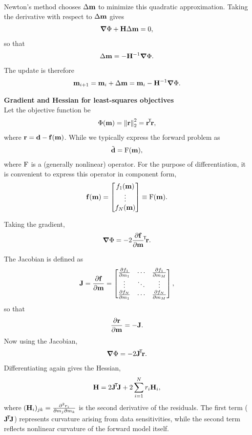 {    Newton's method chooses $\Delta\vb{m}$ to minimize this quadratic approximation. Taking the derivative with respect to $\Delta\vb{m}$ gives
    \[
        \grad \Phi + \vb{H} \Delta\vb{m} = 0,
    \]
    so that
    \[
        \Delta\vb{m} = - \vb{H}^{-1} \grad \Phi.
    \]
    The update is therefore
    \begin{equation}
        \vb{m}_{i+1} = \vb{m}_i + \Delta\vb{m}
        = \vb{m}_i - \vb{H}^{-1} \grad \Phi.
        \label{eq:newton_update}
    \end{equation}

    \medskip
    \noindent\textbf{Gradient and Hessian for least-squares objectives} \\
    Let the objective function be
    \[
        \Phi(\vb{m}) = \norm{\vb{r}}_2^2 = \vb{r}\!^\mathsf{T}\! \vb{r},
    \]
    where $\vb{r} = \vb{d} - \vb{f}(\vb{m})$.  While we typically express the forward problem as
    \[
        \tilde{\vb{d}} = \operatorname{F}(\vb{m}),
    \]
    where $\operatorname{F}$ is a (generally nonlinear) operator. For the purpose of differentiation, it is convenient to express this operator in component form,
    \[
        \vb{f}(\vb{m}) =
        \begin{bmatrix}
            f_1(\vb{m}) \\
            \vdots \\
            f_N(\vb{m})
        \end{bmatrix}
        \equiv \operatorname{F}(\vb{m}).
    \]

    Taking the gradient,
    \[
        \grad \Phi = -2 \pdv{\vb{f}}{\vb{m}}\!^\mathsf{T}\! \vb{r}.
    \]

    The Jacobian is defined as
    \[
        \vb{J} = \pdv{\vb{f}}{\vb{m}} = 
        \begin{bmatrix}
            \pdv{f_1}{m_1} & \cdots & \pdv{f_1}{m_M} \\
            \vdots & \ddots & \vdots \\
            \pdv{f_N}{m_1} & \cdots & \pdv{f_N}{m_M}
        \end{bmatrix},
    \]
    so that
    \[
        \pdv{\vb{r}}{\vb{m}} = -\vb{J}.
    \]
    Now using the Jacobian,
    \begin{equation}
        \grad \Phi = -2 \vb{J}\!^\mathsf{T}\! \vb{r}.
        \label{eq:grad_obj}
    \end{equation}
    Differentiating again gives the Hessian,
    \[
        \vb{H}
        = 2 \vb{J}\!^\mathsf{T}\! \vb{J}
        + 2 \sum_{i=1}^N r_i \vb{H}_i,
    \]
    where $(\vb{H}_i)_{jk} = \pdv{r_i}{m_j}{m_k}$ is the second derivative of the residuals.  The first term ($\vb{J}\!^\mathsf{T}\! \vb{J}$) represents curvature arising from data sensitivities, while the second term reflects nonlinear curvature of the forward model itself.

}
